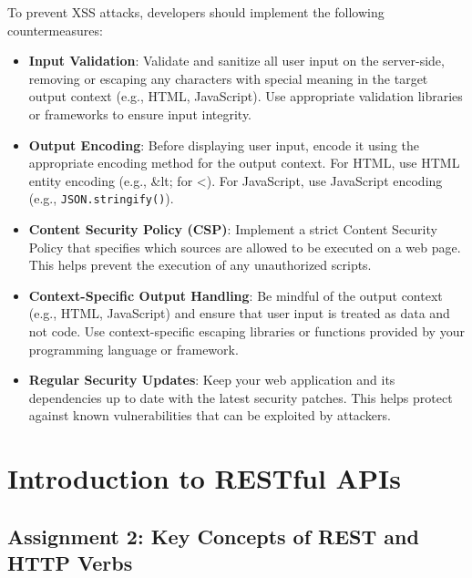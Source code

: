 \documentclass{article}
\begin{document}
To prevent XSS attacks, developers should implement the following countermeasures:

\begin{itemize}
  \item \textbf{Input Validation}: Validate and sanitize all user input on the server-side, removing or escaping any characters with special meaning in the target output context (e.g., HTML, JavaScript). Use appropriate validation libraries or frameworks to ensure input integrity.
  \item \textbf{Output Encoding}: Before displaying user input, encode it using the appropriate encoding method for the output context. For HTML, use HTML entity encoding (e.g., \&lt; for <). For JavaScript, use JavaScript encoding (e.g., \texttt{JSON.stringify()}).
  \item \textbf{Content Security Policy (CSP)}: Implement a strict Content Security Policy that specifies which sources are allowed to be executed on a web page. This helps prevent the execution of any unauthorized scripts.
  \item \textbf{Context-Specific Output Handling}: Be mindful of the output context (e.g., HTML, JavaScript) and ensure that user input is treated as data and not code. Use context-specific escaping libraries or functions provided by your programming language or framework.
  \item \textbf{Regular Security Updates}: Keep your web application and its dependencies up to date with the latest security patches. This helps protect against known vulnerabilities that can be exploited by attackers.
\end{itemize}

\section*{Introduction to RESTful APIs}

\subsection*{Assignment 2: Key Concepts of REST and HTTP Verbs}
\end{document}

